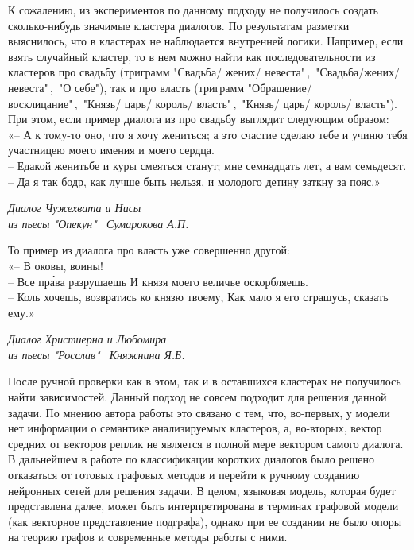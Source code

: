 \documentclass[a4paper,14pt]{article}
\begin{document}
\begin{justify}
\indent
К сожалению, из экспериментов по данному подходу не получилось создать сколько-нибудь значимые кластера диалогов. По результатам разметки выяснилось, что в кластерах не наблюдается внутренней логики. Например, если взять случайный кластер, то в нем можно найти как последовательности из кластеров про свадьбу (триграмм "Свадьба/ жених/ невеста"\,,\ "Свадьба/жених/невеста"\,,\ "О себе"), так и про власть (триграмм "Обращение/ восклицание"\,,\ "Князь/ царь/ король/ власть"\,,\ "Князь/ царь/ король/ власть"). \\
\indent
При этом, если пример диалога из про свадьбу выглядит следующим образом: \\
\indent
«-- А к тому-то оно, что я хочу жениться; а это счастие сделаю тебе и учиню тебя участницею моего имения и моего сердца. \\
\indent
-- Едакой женитьбе и куры смеяться станут; мне семнадцать лет, а вам семьдесят. \\
\indent
-- Да я так бодр, как лучше быть нельзя, и молодого детину заткну за пояс.»
\begin{flushright}\textit{Диалог Чужехвата и Нисы\\из пьесы "Опекун" \ Сумарокова А.П.}\end{flushright}
\indent
То пример из диалога про власть уже совершенно другой: \\
\indent
«-- В оковы, воины! \\
\indent
-- Все пра́ва разрушаешь И князя моего величье оскорбляешь. \\
\indent
-- Коль хочешь, возвратись ко князю твоему, Как мало я его страшусь, сказать ему.»
\begin{flushright}\textit{Диалог Христиерна и Любомира\\из пьесы "Росслав" \ Княжнина Я.Б.}\end{flushright}
\indent
После ручной проверки как в этом, так и в оставшихся кластерах не получилось найти зависимостей. Данный подход не совсем подходит для решения данной задачи. По мнению автора работы это связано с тем, что, во-первых, у модели нет информации о семантике анализируемых кластеров, а, во-вторых, вектор средних от векторов реплик не является в полной мере вектором самого диалога. \\
\indent
В дальнейшем в работе по классификации коротких диалогов было решено отказаться от готовых графовых методов и перейти к ручному созданию нейронных сетей для решения задачи. В целом, языковая модель, которая будет представлена далее, может быть интерпретирована в терминах графовой модели (как векторное представление подграфа), однако при ее создании не было опоры на теорию графов и современные методы работы с ними. \\

\end{justify}
\end{document}
